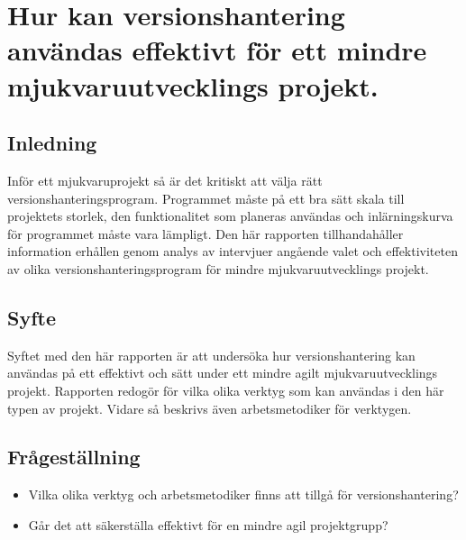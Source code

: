 

\chapter{Hur kan versionshantering användas effektivt för ett mindre mjukvaruutvecklings projekt.}



\vspace{1.5em}
\section{Inledning}
Inför ett mjukvaruprojekt så är det kritiskt att välja rätt versionshanteringsprogram. Programmet måste på ett bra sätt skala till projektets storlek, den funktionalitet som planeras användas och inlärningskurva för programmet måste vara lämpligt. Den här rapporten tillhandahåller information erhållen genom analys av intervjuer angående valet och effektiviteten av olika versionshanteringsprogram för mindre mjukvaruutvecklings projekt.

\vspace{1.5em}
\section{Syfte}
Syftet med den här rapporten är att undersöka hur versionshantering kan användas på ett effektivt och sätt under ett mindre agilt mjukvaruutvecklings projekt. Rapporten redogör för vilka olika verktyg som kan användas i den här typen av projekt. Vidare så beskrivs även arbetsmetodiker för verktygen.

\vspace{1.5em}
\section{Frågeställning}
\begin{itemize} \vspace{1em}
    \item Vilka olika verktyg och arbetsmetodiker finns att tillgå för versionshantering?

    \item Går det att säkerställa effektivt för en mindre agil projektgrupp?

\end{itemize}


